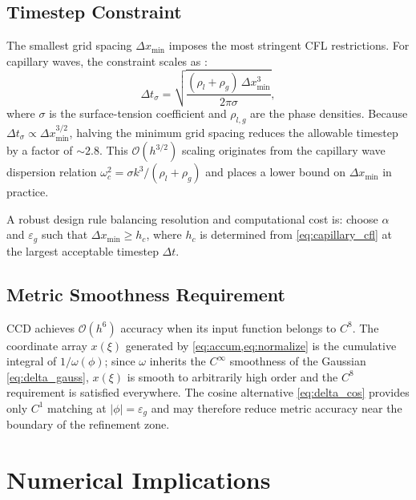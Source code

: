 \documentclass[10pt,a4paper,twocolumn]{article}
\newcommand{\Ord}[1]{\mathcal{O}(#1)}
\newcommand{\eps}{\varepsilon}
\begin{document}
\subsection{Timestep Constraint}
\label{sec:param_cfl}

The smallest grid spacing $\Delta x_{\min}$ imposes the most stringent CFL
restrictions. For capillary waves, the constraint scales as
\cite{Brackbill1992}:
\begin{equation}
  \Delta t_\sigma = \sqrt{\frac{(\rho_l + \rho_g)\,\Delta x_{\min}^3}{2\pi\sigma}},
  \label{eq:capillary_cfl}
\end{equation}
where $\sigma$ is the surface-tension coefficient and $\rho_{l,g}$ are the
phase densities. Because $\Delta t_\sigma \propto \Delta x_{\min}^{3/2}$,
halving the minimum grid spacing reduces the allowable timestep by a factor
of $\sim\!2.8$.  This $\Ord{h^{3/2}}$ scaling originates from the capillary
wave dispersion relation $\omega_c^2 = \sigma k^3/(\rho_l + \rho_g)$ and
places a lower bound on $\Delta x_{\min}$ in practice.

A robust design rule balancing resolution and computational cost is:
choose $\alpha$ and $\eps_g$ such that $\Delta x_{\min} \ge h_c$, where
$h_c$ is determined from \cref{eq:capillary_cfl} at the largest acceptable
timestep $\Delta t$.

\subsection{Metric Smoothness Requirement}

CCD achieves $\Ord{h^6}$ accuracy when its input function belongs to
$C^8$. The coordinate array $x(\xi)$ generated by \cref{eq:accum,eq:normalize}
is the cumulative integral of $1/\omega(\phi)$; since $\omega$ inherits the
$C^\infty$ smoothness of the Gaussian \eqref{eq:delta_gauss}, $x(\xi)$ is
smooth to arbitrarily high order and the $C^8$ requirement is satisfied
everywhere. The cosine alternative \eqref{eq:delta_cos} provides only
$C^1$ matching at $|\phi| = \eps_g$ and may therefore reduce metric
accuracy near the boundary of the refinement zone.

\section{Numerical Implications}
\label{sec:numerics}
\end{document}
